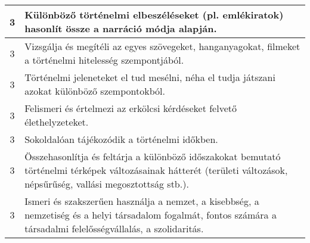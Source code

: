 \begin{longtable}{c | p{} }
                                          3 &  Különböző történelmi elbeszéléseket (pl. emlékiratok) hasonlít össze a narráció módja alapján. \\ \hline
                                          3 &  Vizsgálja és megítéli az egyes szövegeket, hanganyagokat, filmeket a történelmi hitelesség szempontjából. \\ \hline
                                          3 &  Történelmi jeleneteket el tud mesélni, néha el tudja játszani azokat különböző szempontokból. \\ \hline
                                          3 &  Felismeri és értelmezi az erkölcsi kérdéseket felvető élethelyzeteket. \\ \hline
                                          3 &  Sokoldalóan tájékozódik a történelmi időkben. \\ \hline
                                          3 &  Összehasonlítja és feltárja a különböző időszakokat bemutató történelmi térképek változásainak hátterét (területi változások, népsűrűség, vallási megosztottság stb.). \\ \hline
                                          3 &  Ismeri és szakszerűen használja a nemzet, a kisebbség, a nemzetiség és a helyi társadalom fogalmát, fontos számára a társadalmi felelősségvállalás, a szolidaritás. \\ \hline
                                      

\end{longtable}
